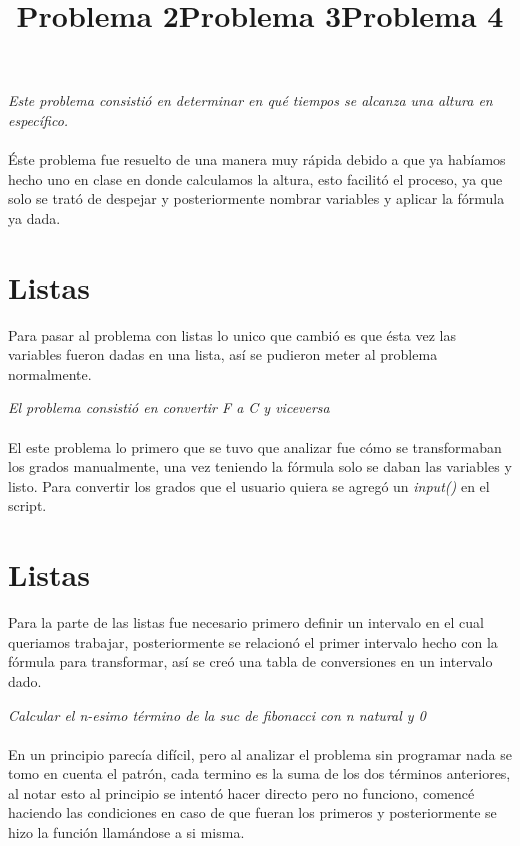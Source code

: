 \documentclass{book}
\begin{document}
		\begin{center}
		\title {\Huge Problema 2} 
	\end{center}
	\textit{Este problema consistió en determinar en qué tiempos se alcanza una altura en específico.}\\
	\\
	Éste problema fue resuelto de una manera muy rápida debido a que ya habíamos hecho uno en clase en donde calculamos la altura, esto facilitó el proceso, ya que solo se trató de despejar y posteriormente nombrar variables y aplicar la fórmula ya dada.
	
	\section*{Listas}
	
	Para pasar al problema con listas lo unico que cambió es que ésta vez las variables fueron dadas en una lista, así se pudieron meter al problema normalmente.
	
		\begin{center}
		\title {\Huge Problema 3} 
	\end{center}
	
	\textit{El problema consistió en convertir F a C y viceversa}\\
	\\
	
	El este problema lo primero que se tuvo que analizar fue cómo se transformaban los grados manualmente, una vez teniendo la fórmula solo se daban las variables y listo. Para convertir los grados que el usuario quiera se agregó un \textit{input()} en el script.
	
	\section*{Listas}
	
	Para la parte de las listas fue necesario primero definir un intervalo en el cual queriamos trabajar, posteriormente se relacionó el primer intervalo hecho con la fórmula para transformar, así se creó una tabla de conversiones en un intervalo dado.
	
	\begin{center}
		\title {\Huge Problema 4} 
	\end{center}
	
	\textit{Calcular el n-esimo término de la suc de fibonacci con n natural y 0}\\
	\\
	En un principio parecía difícil, pero al analizar el problema sin programar nada se tomo en cuenta el patrón, cada termino es la suma de los dos términos anteriores, al notar esto al principio se intentó hacer directo pero no funciono, comencé haciendo las condiciones en caso de que fueran los primeros y posteriormente se hizo la función llamándose a si misma.\\
	\\
\end{document}
